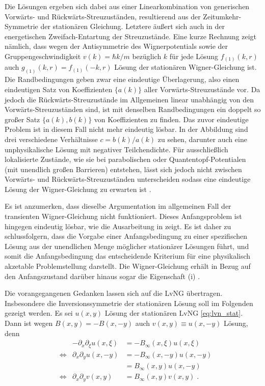 Die Lösungen ergeben sich dabei aus einer Linearkombination von generischen Vorwärts- und Rückwärts-Streuzuständen, resultierend aus der Zeitumkehr-Symmetrie der stationären Gleichung. Letztere äußert sich auch in der energetischen Zweifach-Entartung der Streuzustände. Eine kurze Rechnung zeigt nämlich, dass wegen der Antisymmetrie des Wignerpotentials sowie der Gruppengeschwindigkeit $v(k) = \hbar k/m$ bezüglich $k$ für jede Lösung $f_{(1)}(k,r)$ auch ${g_{(1)}(k,r) = f_{(1)}(-k,r)}$ Lösung der stationären Wigner-Gleichung ist. Die Randbedingungen geben zwar eine eindeutige Überlagerung, also einen eindeutigen Satz von Koeffizienten $\{a(k)\}$  aller Vorwärts-Streuzustände vor. Da jedoch die Rückwärts-Streuzustände im Allgemeinen linear unabhängig von den Vorwärts-Streuzuständen sind, ist mit denselben Randbedingungen ein doppelt so großer Satz $\{a(k),b(k)\}$ von Koeffizienten zu finden. Das zuvor eindeutige Problem ist in diesem Fall nicht mehr eindeutig lösbar. In der Abbildung sind drei verschiedene Verhältnisse $c=b(k)/a(k)$ zu sehen, darunter auch eine unphysikalische Lösung mit negativer Teilchendichte. Für ausschließlich lokalisierte Zustände, wie sie bei parabolischen oder Quantentopf-Potentialen (mit unendlich großen Barrieren) entstehen, lässt sich jedoch nicht zwischen Vorwärts- und Rückwärts-Streuzuständen unterscheiden sodass eine eindeutige Lösung der Wigner-Gleichung zu erwarten ist \cite{failure}.

Es ist anzumerken, dass dieselbe Argumentation  im allgemeinen Fall der transienten Wigner-Gleichung nicht funktioniert. Dieses Anfangsproblem ist hingegen eindeutig lösbar, wie die Ausarbeitung in \cite{dimov2015boundary} zeigt. Es ist daher zu schlussfolgern, dass die Vorgabe einer Anfangsbedingung zu einer spezifischen Lösung aus der unendlichen Menge möglicher stationärer Lösungen führt, und somit die Anfangsbedingung das entscheidende Kriterium für eine physikalisch akzetable Problemstellung darstellt. Die Wigner-Gleichung erhält in Bezug auf den Anfangszustand darüber hinaus sogar die Eigenschaft (i) \cite{dimov2015boundary}.

Die vorangegangenen Gedanken lassen sich auf die LvNG übertragen. Insbesondere die Inversionssymmetrie der stationären Lösung soll im Folgenden gezeigt werden. Es sei $u(x,y)$ Lösung der stationären LvNG \eqref{eq:lvn_stat}. Dann ist wegen $B(x,y)=-B(x,-y)$ auch $v(x,y)\equiv u(x,-y)$ Lösung, denn
\begin{align*}
  & &-\partial_x \partial_{\xi} u(x,{\xi}) &= - B_{\infty}(x,{\xi})u(x,{\xi}) \\
  &\Leftrightarrow &\partial_x \partial_y u(x,-y) &= - B_{\infty}(x,-y)u(x,-y) \\
  & & &=  B_{\infty}(x,y)u(x,-y) \\
  &\Leftrightarrow &\partial_x \partial_y v(x,y) &=  B_{\infty}(x,y)v(x,y) \; .
\end{align*}

